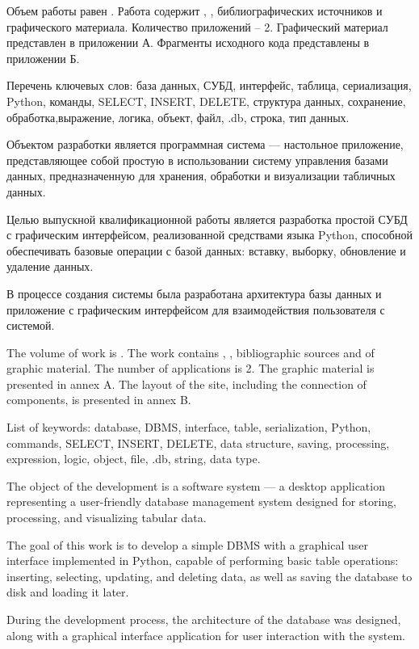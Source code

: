 
Объем работы равен . Работа содержит , ,  библиографических источников и  графического материала. Количество приложений – 2. Графический материал представлен в приложении А. Фрагменты исходного кода представлены в приложении Б.

Перечень ключевых слов: база данных, СУБД, интерфейс, таблица, сериализация, Python, команды, SELECT, INSERT, DELETE, структура данных, сохранение, обработка,выражение, логика, объект, файл, .db, строка, тип данных.

Объектом разработки является программная система — настольное приложение, представляющее собой простую в использовании систему управления базами данных, предназначенную для хранения, обработки и визуализации табличных данных.

Целью выпускной квалификационной работы является разработка простой СУБД с графическим интерфейсом, реализованной средствами языка Python, способной обеспечивать базовые операции с базой данных: вставку, выборку, обновление и удаление данных.

В процессе создания системы была разработана архитектура базы данных и приложение с графическим интерфейсом для взаимодействия пользователя с системой.

  
The volume of work is . The work contains , ,  bibliographic sources and  of graphic material. The number of applications is 2. The graphic material is presented in annex A. The layout of the site, including the connection of components, is presented in annex B.

List of keywords: database, DBMS, interface, table, serialization, Python, commands, SELECT, INSERT, DELETE, data structure, saving, processing, expression, logic, object, file, .db, string, data type.

The object of the development is a software system — a desktop application representing a user-friendly database management system designed for storing, processing, and visualizing tabular data.

The goal of this work is to develop a simple DBMS with a graphical user interface implemented in Python, capable of performing basic table operations: inserting, selecting, updating, and deleting data, as well as saving the database to disk and loading it later.

During the development process, the architecture of the database was designed, along with a graphical interface application for user interaction with the system.

